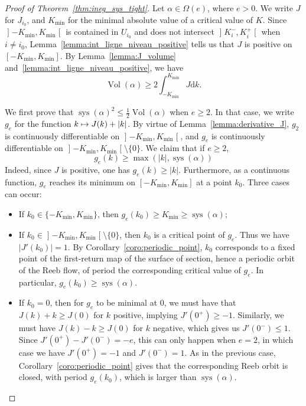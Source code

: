 \documentclass[10pt,a4paper]{amsart}
\DeclareMathOperator{\vol}{Vol}
\DeclareMathOperator{\sys}{sys}
\newcommand{\rmd}{\mathrm{d}}
\let\oldmapsto\mapsto
\renewcommand*{\mapsto}{\mathchoice{\longmapsto}{\oldmapsto}{\oldmapsto}{\oldmapsto}}
\theoremstyle{definition}\newtheorem{defi}[theo]{Definition}
\begin{document}
\begin{proof}[{Proof of Theorem~\ref{thm:ineg_sys_tight}}]
Let $\alpha \in \Omega(e)$, where $e > 0$. We write $J$ for $J_{i_0}$, and $K_{\min}$ for the minimal absolute value of a critical value of $K$. Since $\mathopen{]}-K_{\min}, K_{\min}\mathclose{[}$ is contained in $U_{i_0}$ and does not intersect $\mathopen{]}K_i^-, K_i^+\mathclose{[}$ when $i \neq i_0$, Lemma~\ref{lemma:int_ligne_niveau_positive} tells us that $J$ is positive on $[-K_{\min}, K_{\min}]$. By Lemma~\ref{lemma:J_volume} and~\ref{lemma:int_ligne_niveau_positive}, we have
\begin{equation}\label{eq:volume_J_degre_1}
\vol(\alpha) \geq 2 \int_{-K_{\min}}^{K_{\min}} J \rmd k.
\end{equation}

We first prove that $\sys(\alpha)^2 \leq \frac{1}{2} \vol(\alpha)$ when $e \geq 2$. In that case, we write $g_e$ for the function $k \mapsto J(k) + |k|$. By virtue of Lemma~\ref{lemma:derivative_J}, $g_2$ is continuously differentiable on $\mathopen{]}-K_{\min}, K_{\min}\mathclose{[}$, and $g_e$ is continuously differentiable on $\mathopen{]}-K_{\min}, K_{\min}\mathclose{[}\setminus \{0\}$. We claim that if $e \geq 2$,
\begin{equation}\label{eq:lower_bound_g_e}
g_e(k) \geq \max\left(|k|, \sys(\alpha)\right)
\end{equation}
Indeed, since $J$ is positive, one has $g_e(k) \geq |k|$. Furthermore, as a continuous function, $g_e$ reaches its minimum on $[-K_{\min}, K_{\min}]$ at a point $k_0$. Three cases can occur:
\begin{itemize}
\item If $k_0 \in \{-K_{\min}, K_{\min}\}$, then $g_e(k_0) \geq K_{\min} \geq \sys(\alpha)$;
\item If $k_0 \in\mathopen{]}-K_{\min}, K_{\min}\mathclose{[}\setminus \{0\}$, then $k_0$ is a critical point of $g_e$. Thus we have $|J'(k_0)| = 1$. By Corollary~\ref{coro:periodic_point}, $k_0$ corresponds to a fixed point of the first-return map of the surface of section, hence a periodic orbit of the Reeb flow, of period the corresponding critical value of $g_e$. In particular, $g_e(k_0) \geq \sys(\alpha)$.
\item If $k_0 = 0$, then for $g_e$ to be minimal at 0, we must have that $J(k) + k \geq J(0)$ for $k$ positive, implying $J'(0^+) \geq -1$. Similarly, we must have $J(k) - k \geq J(0)$ for $k$ negative, which gives us $J'(0^-) \leq 1$. Since $J'(0^+)-J'(0^-) = -e$, this can only happen when $e = 2$, in which case we have $J'(0^+) = -1$ and $J'(0^-) = 1$. As in the previous case, Corollary~\ref{coro:periodic_point} gives that the corresponding Reeb orbit is closed, with period $g_e(k_0)$, which is larger than $\sys(\alpha)$.
\end{itemize}


\end{proof}
\end{document}
